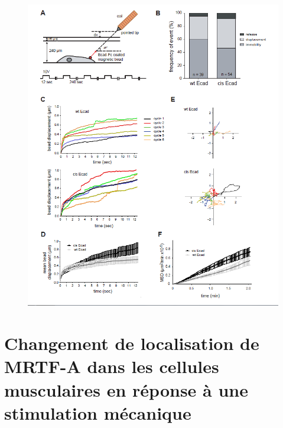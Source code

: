 \documentclass                                                                                                                                                                                                                                                                                                                                       {report}
\begin{document}
 \begin{figure}[p]
 \includegraphics[scale=0.7]{Figures/Strale.png} 

 \end{figure}
 
 \chapter{Changement de localisation de MRTF-A dans les cellules musculaires en réponse à une stimulation mécanique}
 
\end{document}

